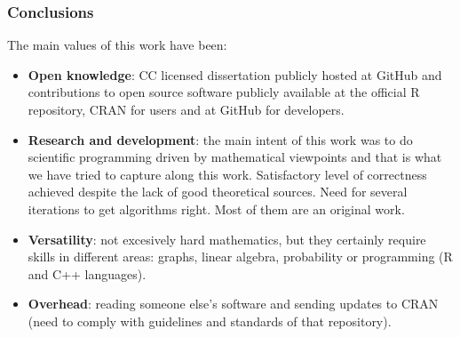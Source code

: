 \begin{frame}\frametitle{Conclusions}
 \vspace{2em}\fontsize{10pt}{0}\selectfont
 The main values of this work have been:
 \begin{itemize}
  \item \textbf{Open knowledge}: CC licensed dissertation publicly hosted at GitHub and contributions to open source software publicly available at the official R repository, CRAN for users and at GitHub for developers.

  \item \textbf{Research and development}: the main intent of this work was to do scientific programming driven by mathematical viewpoints and that is what we have tried to capture along this work. Satisfactory level of correctness achieved despite the lack of good theoretical sources. Need for several iterations to get algorithms right. Most of them are an original work.

  \item \textbf{Versatility}: not excesively hard mathematics, but they certainly require skills in different areas: graphs, linear algebra, probability or programming (R and C++ languages).

  \item \textbf{Overhead}: reading someone else's software and sending updates to CRAN (need to comply with guidelines and standards of that repository).
 \end{itemize}
\end{frame}
